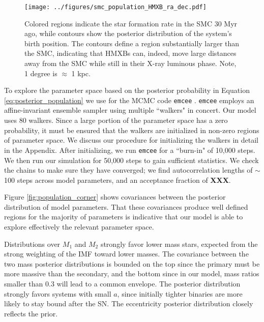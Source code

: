 \documentclass[usenatbib]{mnras}
\begin{document}
\begin{figure}
\begin{center}
\texttt{[image: ../figures/smc\_population\_HMXB\_ra\_dec.pdf]}
\caption{ Colored regions indicate the star formation rate in the SMC 30 Myr ago, while contours show the posterior distribution of the system's birth position. The contours define a region substantially larger than the SMC, indicating that HMXBs can, indeed, move large distances away from the SMC while still in their X-ray luminous phase. Note, 1 degree is $\approx$ 1 kpc.}
\label{fig:population_ra_dec}
\end{center}
\end{figure}



To explore the parameter space based on the posterior probability in Equation \ref{eq:posterior_population} we use for the MCMC code {\tt emcee} \citep{foreman-mackey13}. {\tt emcee} employs an affine-invariant ensemble sampler using multiple ``walkers" in concert\citep{goodman10}. Our model uses 80 walkers. Since a large portion of the parameter space has a zero probability, it must be ensured that the walkers are initialized in non-zero regions of parameter space. We discuss our procedure for initializing the walkers in detail in the Appendix. After initializing, we run {\tt emcee} for a ``burn-in" of 10,000 steps. We then run our simulation for 50,000 steps to gain sufficient statistics. We check the chains to make sure they have converged; we find autocorrelation lengths of $\sim$100 steps across model parameters, and an acceptance fraction of {\bf XXX}. 

Figure \ref{fig:population_corner} shows covariances between the posterior distribution of model parameters. That these covariances produce well defined regions for the majority of parameters is indicative that our model is able to explore effectively the relevant parameter space. 

Distributions over $M_1$ and $M_2$ strongly favor lower mass stars, expected from the strong weighting of the IMF toward lower masses. The covariance between the two mass posterior distributions is bounded on the top since the primary must be more massive than the secondary, and the bottom since in our model, mass ratios smaller than 0.3 will lead to a common envelope. The posterior distribution strongly favors systems with small $a$, since initially tighter binaries are more likely to stay bound after the SN. The eccentricity posterior distribution closely reflects the prior. 
\end{document}
